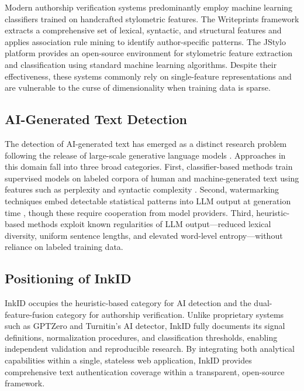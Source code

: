\documentclass[conference]{IEEEtran}
\begin{document}
Modern authorship verification systems predominantly employ machine learning
classifiers trained on handcrafted stylometric features. The Writeprints
framework \cite{abbasi2008writeprints} extracts a comprehensive set of lexical,
syntactic, and structural features and applies association rule mining to
identify author-specific patterns. The JStylo platform \cite{mcdonald2012jstylo}
provides an open-source environment for stylometric feature extraction and
classification using standard machine learning algorithms. Despite their
effectiveness, these systems commonly rely on single-feature representations
and are vulnerable to the curse of dimensionality when training data is sparse.

\subsection{AI-Generated Text Detection}

The detection of AI-generated text has emerged as a distinct research problem
following the release of large-scale generative language models \cite{brown2020gpt3}.
Approaches in this domain fall into three broad categories. First,
classifier-based methods train supervised models on labeled corpora of human
and machine-generated text using features such as perplexity and syntactic
complexity \cite{gehrmann2019gltr}. Second, watermarking techniques embed
detectable statistical patterns into LLM output at generation time
\cite{kirchenbauer2023watermark}, though these require cooperation from model
providers. Third, heuristic-based methods exploit known regularities of LLM
output—reduced lexical diversity, uniform sentence lengths, and elevated
word-level entropy—without reliance on labeled training data.

\subsection{Positioning of InkID}

InkID occupies the heuristic-based category for AI detection and the
dual-feature-fusion category for authorship verification. Unlike proprietary
systems such as GPTZero and Turnitin's AI detector, InkID fully documents its
signal definitions, normalization procedures, and classification thresholds,
enabling independent validation and reproducible research. By integrating both
analytical capabilities within a single, stateless web application, InkID
provides comprehensive text authentication coverage within a transparent,
open-source framework.
\end{document}
